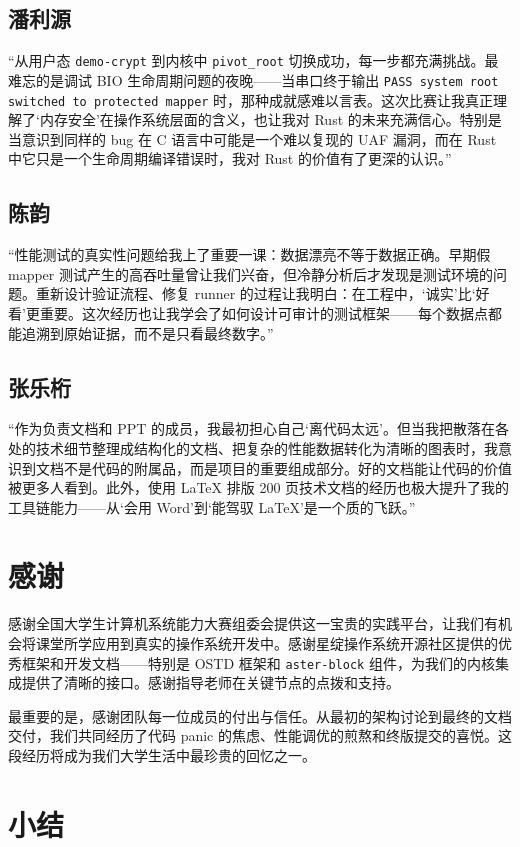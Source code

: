 \subsection{潘利源}
“从用户态 \texttt{demo-crypt} 到内核中 \texttt{pivot\_root} 切换成功，每一步都充满挑战。最难忘的是调试 BIO 生命周期问题的夜晚——当串口终于输出 \texttt{PASS system root switched to protected mapper} 时，那种成就感难以言表。这次比赛让我真正理解了‘内存安全’在操作系统层面的含义，也让我对 Rust 的未来充满信心。特别是当意识到同样的 bug 在 C 语言中可能是一个难以复现的 UAF 漏洞，而在 Rust 中它只是一个生命周期编译错误时，我对 Rust 的价值有了更深的认识。”

\subsection{陈韵}
“性能测试的真实性问题给我上了重要一课：数据漂亮不等于数据正确。早期假 mapper 测试产生的高吞吐量曾让我们兴奋，但冷静分析后才发现是测试环境的问题。重新设计验证流程、修复 runner 的过程让我明白：在工程中，‘诚实’比‘好看’更重要。这次经历也让我学会了如何设计可审计的测试框架——每个数据点都能追溯到原始证据，而不是只看最终数字。”

\subsection{张乐桁}
“作为负责文档和 PPT 的成员，我最初担心自己‘离代码太远’。但当我把散落在各处的技术细节整理成结构化的文档、把复杂的性能数据转化为清晰的图表时，我意识到文档不是代码的附属品，而是项目的重要组成部分。好的文档能让代码的价值被更多人看到。此外，使用 LaTeX 排版 200 页技术文档的经历也极大提升了我的工具链能力——从‘会用 Word’到‘能驾驭 LaTeX’是一个质的飞跃。”

\section{感谢}

感谢全国大学生计算机系统能力大赛组委会提供这一宝贵的实践平台，让我们有机会将课堂所学应用到真实的操作系统开发中。感谢星绽操作系统开源社区提供的优秀框架和开发文档——特别是 OSTD 框架和 \texttt{aster-block} 组件，为我们的内核集成提供了清晰的接口。感谢指导老师在关键节点的点拨和支持。

最重要的是，感谢团队每一位成员的付出与信任。从最初的架构讨论到最终的文档交付，我们共同经历了代码 panic 的焦虑、性能调优的煎熬和终版提交的喜悦。这段经历将成为我们大学生活中最珍贵的回忆之一。

\section{小结}


